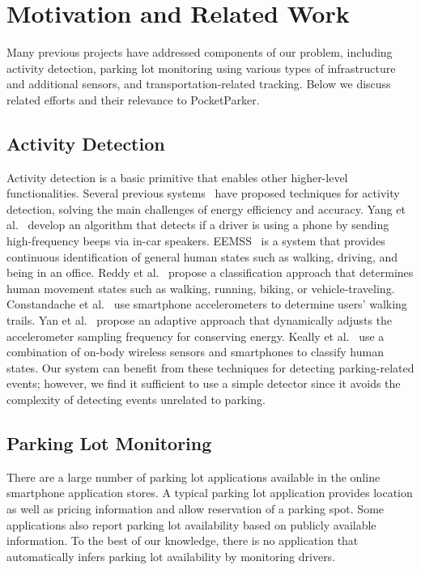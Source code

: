 \section{Motivation and Related Work}
\label{sec-related}
Many previous projects have addressed components of our problem, including
activity detection, parking lot monitoring using various types of
infrastructure and additional sensors, and transportation-related tracking.
Below we discuss related efforts and their relevance to PocketParker.

\subsection{Activity Detection}
Activity detection is a basic primitive that enables other higher-level
functionalities. Several previous systems~\cite{Constandache:2010:DYS,
Keally:2011:PTP, Reddy:2010:UMP, Yang:2011:DDP, Wang:2009:FEE} have proposed
techniques for activity detection, solving the main challenges of energy
efficiency and accuracy. Yang et al.~\cite{Yang:2011:DDP} develop an algorithm
that detects if a driver is using a phone by sending high-frequency beeps via
in-car speakers. EEMSS~\cite{Wang:2009:FEE} is a system that provides continuous
identification of general human states such as walking, driving, and being in an
office. Reddy et al.~\cite{Reddy:2010:UMP} propose a classification approach
that determines human movement states such as walking, running, biking, or
vehicle-traveling. Constandache et al.~\cite{Constandache:2010:DYS} use
smartphone accelerometers to determine users' walking trails. Yan et
al.~\cite{6246136} propose an adaptive approach that dynamically adjusts the
accelerometer sampling frequency for conserving energy. Keally et
al.~\cite{Keally:2011:PTP} use a combination of on-body wireless sensors and
smartphones to classify human states. Our system can benefit from these
techniques for detecting parking-related events; however, we find it sufficient
to use a simple detector since it avoids the complexity of detecting events
unrelated to parking.
\subsection{Parking Lot Monitoring}
There are a large number of parking lot applications available in the online
smartphone application stores. A typical parking lot application provides
location as well as pricing information and allow reservation of a parking spot.
Some applications also report parking lot availability based on publicly
available information. To the best of our knowledge, there is no application
that automatically infers parking lot availability by monitoring drivers.

